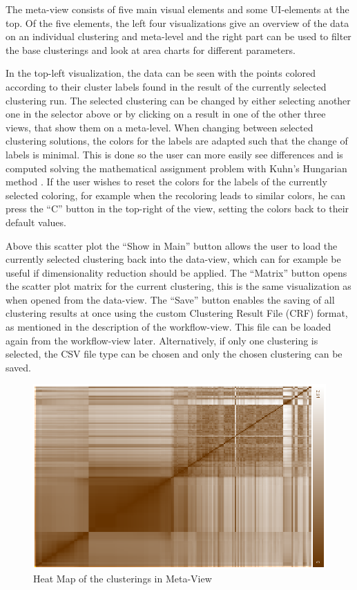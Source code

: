 \documentclass[
	a4paper,
	english,
	twoside,
	openright,               
	11pt                            
	]{report}
\begin{document}
The meta-view consists of five main visual elements and some UI-elements at the top. Of the five elements, the left four visualizations give an overview of the data on an individual clustering and meta-level and the right part can be used to filter the base clusterings and look at area charts for different parameters. 

In the top-left visualization, the data can be seen with the points colored according to their cluster labels found in the result of the currently selected clustering run. The selected clustering can be changed by either selecting another one in the selector above or by clicking on a result in one of the other three views, that show them on a meta-level. When changing between selected clustering solutions, the colors for the labels are adapted such that the change of labels is minimal. This is done so the user can more easily see differences and is computed solving the mathematical assignment problem with Kuhn’s Hungarian method \cite{Kuhn2010}. If the user wishes to reset the colors for the labels of the currently selected coloring, for example when the recoloring leads to similar colors, he can press the ``C'' button in the top-right of the view, setting the colors back to their default values.

Above this scatter plot the ``Show in Main'' button allows the user to load the currently selected clustering back into the data-view, which can for example be useful if dimensionality reduction should be applied. The ``Matrix'' button opens the scatter plot matrix for the current clustering, this is the same visualization as when opened from the data-view. The ``Save'' button enables the saving of all clustering results at once using the custom Clustering Result File (CRF) format, as mentioned in the description of the workflow-view. This file can be loaded again from the workflow-view later. Alternatively, if only one clustering is selected, the CSV file type can be chosen and only the chosen clustering can be saved.

\begin{figure}[h]
	\centering
	\includegraphics[scale=.45]{heat-map}
	\caption{Heat Map of the clusterings in Meta-View}
	\label{fig:heatmap}
\end{figure}
\end{document}
